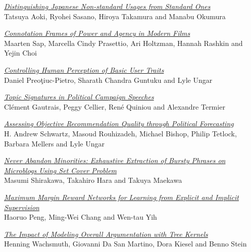 \hyperlink{page.2306}{\em Distinguishing Japanese Non-standard Usages from Standard Ones}\samepage \\
\hspace*{7mm} Tatsuya Aoki, Ryohei Sasano, Hiroya Takamura and Manabu Okumura\dotfill {}

\hyperlink{page.2312}{\em Connotation Frames of Power and Agency in Modern Films}\samepage \\
\hspace*{7mm} Maarten Sap, Marcella Cindy Prasettio, Ari Holtzman, Hannah Rashkin and Yejin Choi\dotfill {}

\hyperlink{page.2318}{\em Controlling Human Perception of Basic User Traits}\samepage \\
\hspace*{7mm} Daniel Preoţiuc-Pietro, Sharath Chandra Guntuku and Lyle Ungar\dotfill {}

\hyperlink{page.2325}{\em Topic Signatures in Political Campaign Speeches}\samepage \\
\hspace*{7mm} Cl\'{e}ment Gautrais, Peggy Cellier, Ren\'{e} Quiniou and Alexandre Termier\dotfill {}

\hyperlink{page.2331}{\em Assessing Objective Recommendation Quality through Political Forecasting}\samepage \\
\hspace*{7mm} H. Andrew Schwartz, Masoud Rouhizadeh, Michael Bishop, Philip Tetlock, Barbara Mellers and Lyle Ungar\dotfill {}

\hyperlink{page.2341}{\em Never Abandon Minorities: Exhaustive Extraction of Bursty Phrases on Microblogs Using Set Cover Problem}\samepage \\
\hspace*{7mm} Masumi Shirakawa, Takahiro Hara and Takuya Maekawa\dotfill {}

\hyperlink{page.2351}{\em Maximum Margin Reward Networks for Learning from Explicit and Implicit Supervision}\samepage \\
\hspace*{7mm} Haoruo Peng, Ming-Wei Chang and Wen-tau Yih\dotfill {}

\hyperlink{page.2362}{\em The Impact of Modeling Overall Argumentation with Tree Kernels}\samepage \\
\hspace*{7mm} Henning Wachsmuth, Giovanni Da San Martino, Dora Kiesel and Benno Stein\dotfill {}

